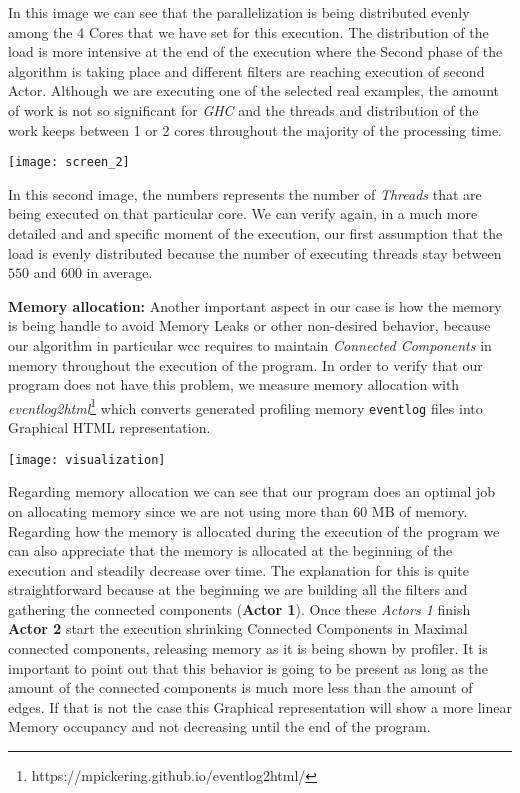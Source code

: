 \documentclass[12pt]{article}
\begin{document}
In this image we can see that the parallelization is being distributed evenly among the 4 Cores that we have set for this execution.
The distribution of the load is more intensive at the end of the execution where the Second phase of the algorithm is taking place and different filters are reaching execution of second Actor.
Although we are executing one of the selected real examples, the amount of work is not so significant for \textit{GHC} and the threads and distribution of the work keeps between 1 or 2 cores throughout 
the majority of the processing time.


\begin{minipage}[t]{\linewidth}
  \texttt{[image: screen\_2]}
  \captionsetup{type=figure}
  \label{fig:2}
\end{minipage}

In this second image, the numbers represents the number of \textit{Threads} that are being executed on that particular core.
We can verify again, in a much more detailed and and specific moment of the execution, our first assumption that the load is evenly distributed because the number of executing threads stay between $550$ and $600$
in average.

\textbf{Memory allocation:} Another important aspect in our case is how the memory is being handle to avoid Memory Leaks or other non-desired behavior, because our algorithm in particular \acrshort{wcc} requires
to maintain \textit{Connected Components} in memory throughout the execution of the program. 
In order to verify that our program does not have this problem, we measure memory allocation with \textit{eventlog2html}\footnote{https://mpickering.github.io/eventlog2html/} which converts generated profiling memory \texttt{eventlog}
files into Graphical HTML representation. 

\begin{minipage}[t]{\linewidth}
  \texttt{[image: visualization]}
  \captionsetup{type=figure}
  \label{fig:3}
\end{minipage}

Regarding memory allocation we can see that our program does an optimal job on allocating memory since we are not using more than $60$ MB of memory.
Regarding how the memory is allocated during the execution of the program we can also appreciate that the memory is allocated at the beginning of the execution and steadily decrease over time.
The explanation for this is quite straightforward because at the beginning we are building all the filters and gathering the connected components (\textbf{Actor 1}). Once these \textit{Actors 1}
finish \textbf{Actor 2} start the execution shrinking Connected Components in Maximal connected components, releasing memory as it is being shown by profiler.
It is important to point out that this behavior is going to be present as long as the amount of the connected components is much more less than the amount of edges. If that is not the case this Graphical
representation will show a more linear Memory occupancy and not decreasing until the end of the program. 
\end{document}
